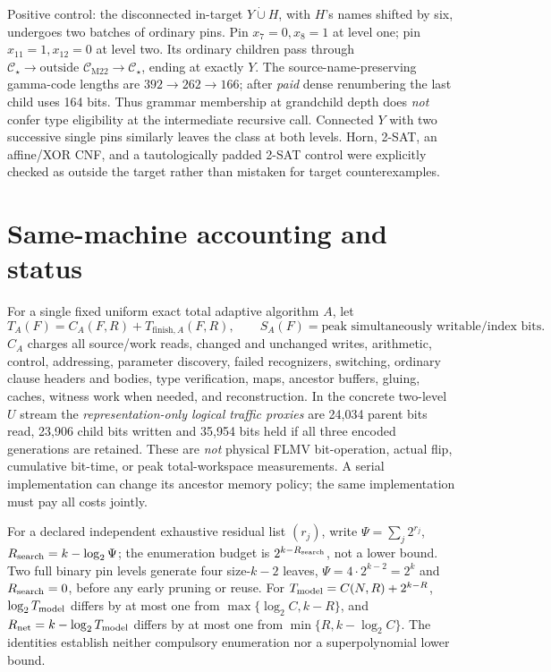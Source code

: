\documentclass[11pt]{article}
\newcommand{\CM}{\mathcal C_{\mathrm{M22}}}
\newcommand{\Cs}{\mathcal C_\star}
\begin{document}
\noindent Positive control: the disconnected in-target \(Y\dot\cup H\), with \(H\)'s names shifted by six, undergoes two batches of ordinary pins. Pin \(x_7=0,x_8=1\) at level one; pin \(x_{11}=1,x_{12}=0\) at level two. Its ordinary children pass through \(\Cs\to\text{outside }\CM\to\Cs\), ending at exactly \(Y\). The source-name-preserving gamma-code lengths are \(392\to262\to166\); after \emph{paid} dense renumbering the last child uses 164 bits. Thus grammar membership at grandchild depth does \emph{not} confer type eligibility at the intermediate recursive call. Connected \(Y\) with two successive single pins similarly leaves the class at both levels. Horn, 2-SAT, an affine/XOR CNF, and a tautologically padded 2-SAT control were explicitly checked as outside the target rather than mistaken for target counterexamples.

\section{Same-machine accounting and status}
For a single fixed uniform exact total adaptive algorithm \(A\), let
\[
T_A(F)=C_A(F,R)+T_{\mathrm{finish},A}(F,R),\qquad S_A(F)=\text{peak simultaneously writable/index bits}.
\]
\(C_A\) charges all source/work reads, changed and unchanged writes, arithmetic, control, addressing, parameter discovery, failed recognizers, switching, ordinary clause headers and bodies, type verification, maps, ancestor buffers, gluing, caches, witness work when needed, and reconstruction. In the concrete two-level \(U\) stream the \emph{representation-only logical traffic proxies} are 24,034 parent bits read, 23,906 child bits written and 35,954 bits held if all three encoded generations are retained. These are \emph{not} physical FLMV bit-operation, actual flip, cumulative bit-time, or peak total-workspace measurements. A serial implementation can change its ancestor memory policy; the same implementation must pay all costs jointly.

\noindent For a declared independent exhaustive residual list \((r_j)\), write \(\Psi=\sum_j2^{r_j}\), \(R_{\rm search}=k-\log_2\Psi\); the enumeration budget is \(2^{k-R_{\rm search}}\), not a lower bound. Two full binary pin levels generate four size-\(k-2\) leaves, \(\Psi=4\cdot2^{k-2}=2^k\) and \(R_{\rm search}=0\), before any early pruning or reuse. For \(T_{\rm model}=C(N,R)+2^{k-R}\), \(\log_2T_{\rm model}\) differs by at most one from \(\max\{\log_2C,k-R\}\), and \(R_{\rm net}=k-\log_2T_{\rm model}\) differs by at most one from \(\min\{R,k-\log_2C\}\). The identities establish neither compulsory enumeration nor a superpolynomial lower bound.
\end{document}
